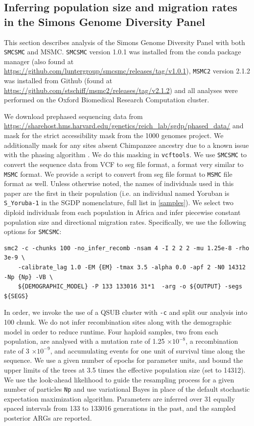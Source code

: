 \documentclass{article}
\begin{document}
\subsection{Inferring population size and migration rates in the Simons Genome Diversity Panel}

This section describes analysis of the Simons Genome Diversity Panel with both {\tt SMCSMC} and MSMC. {\tt SMCSMC} version 1.0.1 was installed from the conda package manager (also found at \url{https://github.com/luntergroup/smcsmc/releases/tag/v1.0.1}), {\tt MSMC2} version 2.1.2 was installed from Github (found at \url{https://github.com/stschiff/msmc2/releases/tag/v2.1.2}) and all analyses were performed on the Oxford Biomedical Research Computation cluster.

We download prephased sequencing data from \url{https://sharehost.hms.harvard.edu/genetics/reich_lab/sgdp/phased_data/} and mask for the strict accessibility mask from the 1000 genomes project. We additionally mask for any sites absent Chimpanzee ancestry due to a known issue with the phasing algorithm \cite{Wang2019a}. We do this masking in {\tt vcftools}. We use {\tt SMCSMC} to convert the sequence data from VCF to seg file format, a format very similar to {\tt MSMC} format. We provide a script to convert from seg file format to {\tt MSMC} file format as well. Unless otherwise noted, the names of individuals used in this paper are the first in their population (i.e. an individual named Yoruban is {\tt S\_Yoruba-1} in the SGDP nomenclature, full list in \ref{samples}).  We select two diploid individuals from each population in Africa  and infer piecewise constant population size and directional migration rates. Specifically, we use the following options for {\tt SMCSMC}:

\begin{verbatim}
smc2 -c -chunks 100 -no_infer_recomb -nsam 4 -I 2 2 2 -mu 1.25e-8 -rho 3e-9 \
    -calibrate_lag 1.0 -EM {EM} -tmax 3.5 -alpha 0.0 -apf 2 -N0 14312 -Np {Np} -VB \
    ${DEMOGRAPHIC_MODEL} -P 133 133016 31*1  -arg -o ${OUTPUT} -segs ${SEGS}
\end{verbatim}

In order, we invoke the use of a QSUB cluster with {\tt -c} and split our analysis into 100 chunk. We do not infer recombination sites along with the demographic model in order to reduce runtime. Four haploid samples, two from each population, are analysed with a mutation rate of 1.25 $\times 10^{-8}$, a recombination rate of 3 $\times 10^{-9}$, and accumulating events for one unit of survival time along the sequence. We use a given number of epochs for parameter units, and bound the upper limits of the trees at 3.5 times the effective population size (set to 14312). We use the look-ahead likelihood to guide the resampling process for a given number of particles {\tt Np} and use variational Bayes in place of the default stochastic expectation maximization algorithm. Parameters are inferred over 31 equally spaced intervals from 133 to 133016 generations in the past, and the sampled posterior ARGs are reported. 
\end{document}

